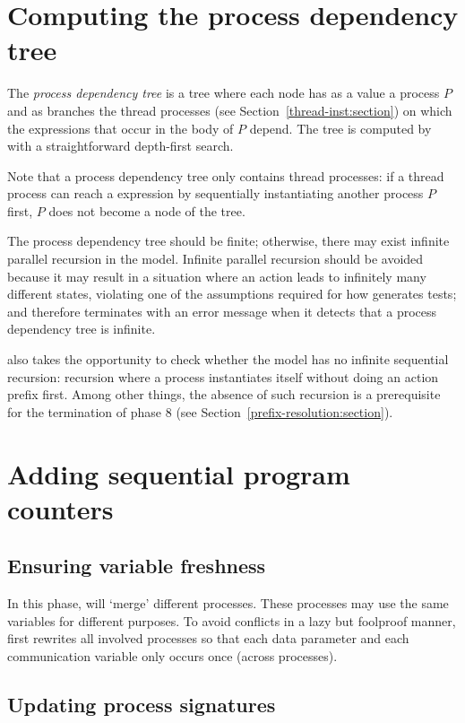 \section{Computing the process dependency tree} \label{procdeptree:section}

The \emph{process dependency tree} is a tree where each node has as a value a process $P$ and as branches the thread processes (see Section~\ref{thread-inst:section}) on which the \pedi{} expressions that occur in the body of $P$ depend.
The tree is computed by \lpeq{} with a straightforward depth-first search.

Note that a process dependency tree only contains thread processes: if a thread process can reach a \pedi{} expression by sequentially instantiating another process $P$ first, $P$ does not become a node of the tree.

The process dependency tree should be finite; otherwise, there may exist infinite parallel recursion in the model.
Infinite parallel recursion should be avoided because it may result in a situation where an action leads to infinitely many different states, violating one of the assumptions required for how \txs{} generates tests; and therefore \lpeq{} terminates with an error message when it detects that a process dependency tree is infinite.

\lpeq{} also takes the opportunity to check whether the model has no infinite sequential recursion: recursion where a process instantiates itself without doing an action prefix first.
Among other things, the absence of such recursion is a prerequisite for the termination of phase 8 (see Section~\ref{prefix-resolution:section}).

\section{Adding sequential program counters}

\subsection{Ensuring variable freshness}

In this phase, \lpeq{} will `merge' different processes.
These processes may use the same variables for different purposes.
To avoid conflicts in a lazy but foolproof manner, \lpeq{} first rewrites all involved processes so that each data parameter and each communication variable only occurs once (across processes).

\subsection{Updating process signatures}

